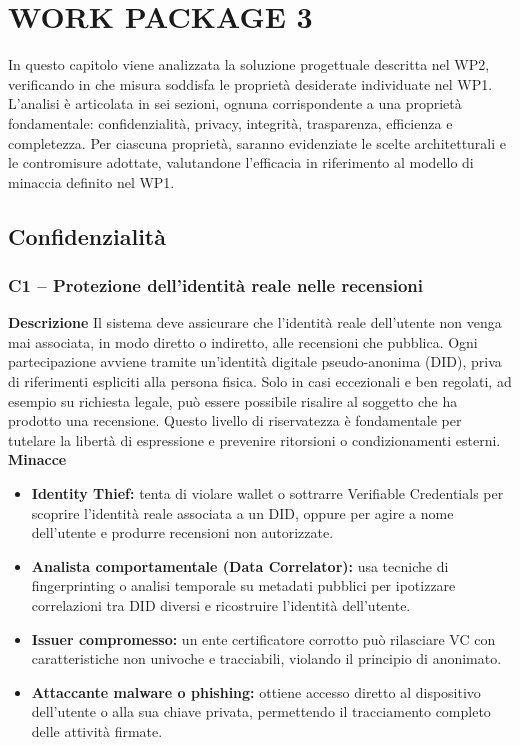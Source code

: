 \chapter{WORK PACKAGE 3}
    In questo capitolo viene analizzata la soluzione progettuale descritta nel WP2, verificando in che misura soddisfa le proprietà desiderate individuate nel WP1. L'analisi è articolata in sei sezioni, ognuna corrispondente a una proprietà fondamentale: confidenzialità, privacy, integrità, trasparenza, efficienza e completezza.
    Per ciascuna proprietà, saranno evidenziate le scelte architetturali e le contromisure adottate, valutandone l'efficacia in riferimento al modello di minaccia definito nel WP1.

    \section{Confidenzialità}
        \subsection{C1 – Protezione dell'identità reale nelle recensioni}
            \noindent \textbf{Descrizione}
                Il sistema deve assicurare che l'identità reale dell'utente non venga mai associata, in modo diretto o indiretto, alle recensioni che pubblica. Ogni partecipazione avviene tramite un'identità digitale pseudo-anonima (DID), priva di riferimenti espliciti alla persona fisica. Solo in casi eccezionali e ben regolati, ad esempio su richiesta legale, può essere possibile risalire al soggetto che ha prodotto una recensione. Questo livello di riservatezza è fondamentale per tutelare la libertà di espressione e prevenire ritorsioni o condizionamenti esterni. \\
    
            \noindent \textbf{Minacce}
                \begin{itemize}
                    \item \textbf{Identity Thief:} tenta di violare wallet o sottrarre Verifiable Credentials per scoprire l'identità reale associata a un DID, oppure per agire a nome dell'utente e produrre recensioni non autorizzate.
                    
                    \item \textbf{Analista comportamentale (Data Correlator):} usa tecniche di fingerprinting o analisi temporale su metadati pubblici per ipotizzare correlazioni tra DID diversi e ricostruire l'identità dell'utente.
                    
                    \item \textbf{Issuer compromesso:} un ente certificatore corrotto può rilasciare VC con caratteristiche non univoche e tracciabili, violando il principio di anonimato.
                    
                    \item \textbf{Attaccante malware o phishing:} ottiene accesso diretto al dispositivo dell'utente o alla sua chiave privata, permettendo il tracciamento completo delle attività firmate.
                \end{itemize}
    
